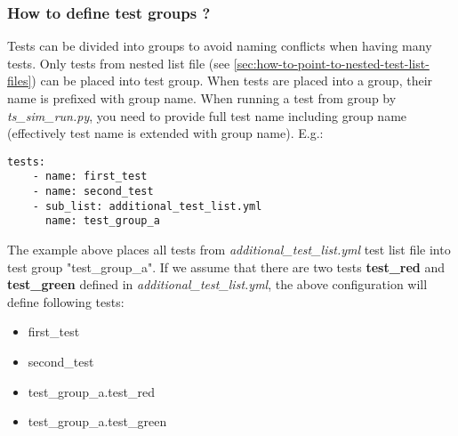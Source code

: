 \documentclass{tropic_design_spec}
\begin{document}
\subsubsection{How to define test groups ?}
\label{sec:how-to-define-test-groups}

Tests can be divided into groups to avoid naming conflicts when having many tests.
Only tests from nested list file (see \ref{sec:how-to-point-to-nested-test-list-files})
can be placed into test group. When tests are placed into a group, their name is
prefixed with group name. When running a test from group by \textit{ts_sim_run.py},
you need to provide full test name including group name (effectively test name is
extended with group name). E.g.:

\begin{lstlisting}
tests:
    - name: first_test
    - name: second_test
    - sub_list: additional_test_list.yml
      name: test_group_a
\end{lstlisting}

The example above places all tests from \textit{additional_test_list.yml} test list
file into test group "test_group_a". If we assume that there are two tests
\textbf{test_red} and \textbf{test_green} defined in \textit{additional_test_list.yml},
the above configuration will define following tests:

\begin{itemize}
    \item{first_test}
    \item{second_test}
    \item{test_group_a.test_red}
    \item{test_group_a.test_green}
\end{itemize}



\end{document}
